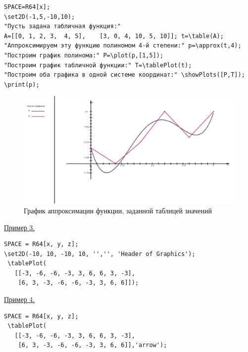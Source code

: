  \vspace*{-2mm}
 \begin{verbatim}
SPACE=R64[x]; 
\set2D(-1,5,-10,10);
"Пусть задана табличная функция:" 
A=[[0, 1, 2, 3,  4, 5],    [3, 0, 4, 10, 5, 10]]; t=\table(A);
"Аппроксимируем эту функцию полиномом 4-й степени:" p=\approx(t,4);
"Построим график полинома:" P=\plot(p,[1,5]);
"Построим график табличной функции:" T=\tablePlot(t);
"Построим оба графика в одной системе координат:" \showPlots([P,T]);
\print(p);
 \end{verbatim}

\begin{figure}[!h]
 \includegraphics[scale=0.25]{pictures/2_8}
\vspace*{-10mm}
\caption{График аппроксимации функции, заданной таблицей значений}
\label{2_8}
\end{figure}

\underline{Пример 3.}
 
 \vspace*{-2mm}

 \begin{verbatim}
SPACE = R64[x, y, z];
\set2D(-10, 10, -10, 10, '','', 'Header of Graphics');
 \tablePlot(
   [[-3, -6, -6, -3, 3, 6, 6, 3, -3],
    [6, 3, -3, -6, -6, -3, 3, 6, 6]]);
 \end{verbatim}

\underline{Пример 4.}
 
 \vspace*{-2mm}

 \begin{verbatim}
SPACE = R64[x, y, z];
 \tablePlot(
   [[-3, -6, -6, -3, 3, 6, 6, 3, -3],
    [6, 3, -3, -6, -6, -3, 3, 6, 6]],'arrow');
 \end{verbatim}

